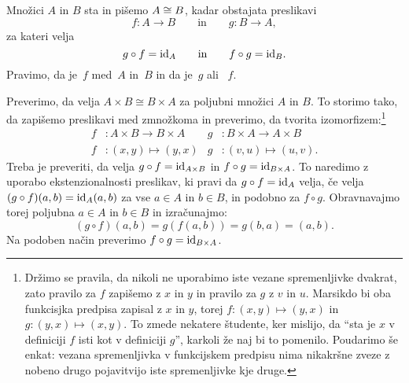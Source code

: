 
\begin{definicija}
  Množici $A$ in $B$ sta  in pišemo $A \ism B$, kadar obstajata preslikavi
  \begin{equation*}
    f : A \to B
    \qquad\text{in}\qquad
    g : B \to A,
  \end{equation*}
  za kateri velja
  \begin{equation*}
    g \circ f = \id[A]
    \qquad\text{in}\qquad
    f \circ g = \id[B].
  \end{equation*}
  Pravimo, da je~$f$  med~$A$ in~$B$ in da je~$g$  ali
  ~$f$.
\end{definicija}

Preverimo, da velja $A \times B \cong B \times A$ za poljubni množici $A$ in $B$. To
storimo tako, da zapišemo preslikavi med zmnožkoma in preverimo, da tvorita
izomorfizem:\footnote{Držimo se pravila, da nikoli ne uporabimo iste vezane spremenljivke
  dvakrat, zato pravilo za $f$ zapišemo z $x$ in $y$ in pravilo za $g$ z $v$ in $u$.
  Marsikdo bi oba funkcisjka predpisa zapisal z $x$ in $y$, torej
  $f : (x, y) \mapsto (y, x)$ in $g : (y, x) \mapsto (x, y)$. To zmede nekatere študente,
  ker mislijo, da ``sta je $x$ v definiciji $f$ isti kot v definiciji $g$'', karkoli že
  naj bi to pomenilo. Poudarimo še enkat: vezana spremenljivka v funkcijskem predpisu nima
  nikakršne zveze z nobeno drugo pojavitvijo iste spremenljivke kje druge.}
%
\begin{align*}
  f &: A \times B \to B \times A &
  g &: B \times A \to A \times B \\
  f &: (x, y) \mapsto (y, x) &
  g &: (v, u) \mapsto (u, v).
\end{align*}
%
Treba je preveriti, da velja $g \circ f = \id[A \times B]$ in
$f \circ g = \id[B \times A]$. To naredimo z uporabo ekstenzionalnosti preslikav, ki pravi
da $g \circ f = \id[A]$ velja, če velja $(g \circ f)(a,b) = \id[A](a,b)$ za vse $a \in A$
in $b \in B$, in podobno za $f \circ g$. Obravnavajmo torej poljubna $a \in A$ in
$b \in B$ in izračunajmo:
%
\begin{equation*}
  (g \circ f)(a, b) =
  g (f (a, b)) = g (b, a) = (a, b).
\end{equation*}
%
Na podoben način preverimo $f \circ g = \id[B \times A]$.

